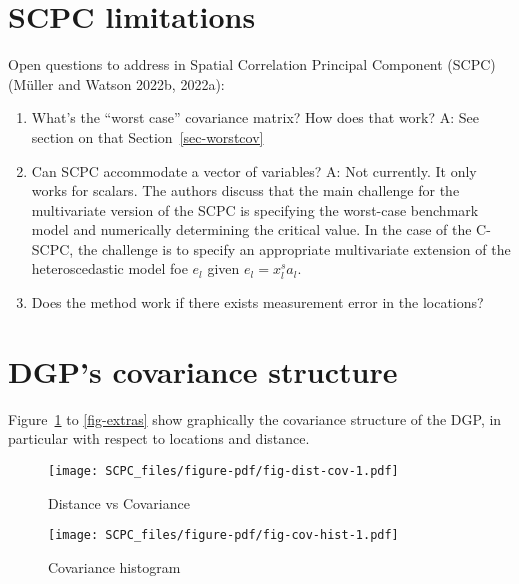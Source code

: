 \documentclass[
]{article}
\providecommand{\tightlist}{%
  \setlength{\itemsep}{0pt}\setlength{\parskip}{0pt}}\usepackage{longtable,booktabs,array}
\begin{document}
\hypertarget{scpc-limitations}{%
\section{SCPC limitations}\label{scpc-limitations}}

Open questions to address in Spatial Correlation Principal Component
(SCPC) (Müller and Watson 2022b, 2022a):

\begin{enumerate}
\def\labelenumi{\arabic{enumi}.}
\tightlist
\item
  What's the ``worst case'' covariance matrix? How does that work? A:
  See section on that Section~\ref{sec-worstcov}
\item
  Can SCPC accommodate a vector of variables? A: Not currently. It only
  works for scalars. The authors discuss that the main challenge for the
  multivariate version of the SCPC is specifying the worst-case
  benchmark model and numerically determining the critical value. In the
  case of the C-SCPC, the challenge is to specify an appropriate
  multivariate extension of the heteroscedastic model foe \(e_l\) given
  \(e_l=x^s_la_l\).
\item
  Does the method work if there exists measurement error in the
  locations?
\end{enumerate}

\hypertarget{dgps-covariance-structure}{%
\section{DGP's covariance structure}\label{dgps-covariance-structure}}

Figure~\ref{fig-dist-cov} to \ref{fig-extras} show graphically the
covariance structure of the DGP, in particular with respect to locations
and distance.

\begin{figure}

{\centering \texttt{[image: SCPC\_files/figure-pdf/fig-dist-cov-1.pdf]}

}

\caption{\label{fig-dist-cov}Distance vs Covariance}

\end{figure}

\begin{figure}

{\centering \texttt{[image: SCPC\_files/figure-pdf/fig-cov-hist-1.pdf]}

}

\caption{\label{fig-cov-hist}Covariance histogram}

\end{figure}
\end{document}
